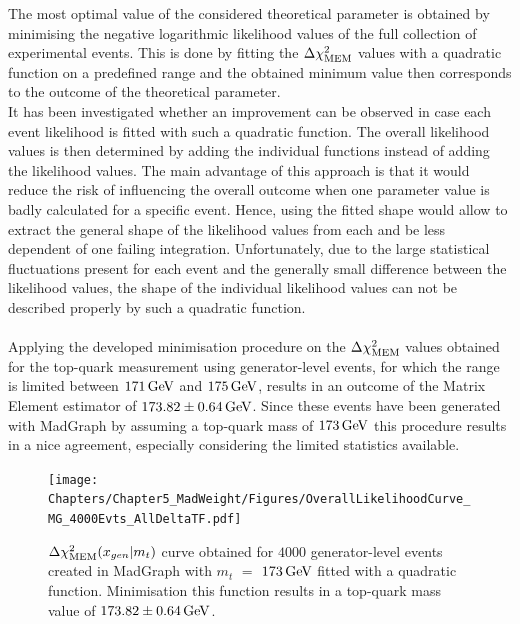 The most optimal value of the considered theoretical parameter is obtained by minimising the negative logarithmic likelihood values of the full collection of experimental events.
This is done by fitting the $\Delta \chi^{2}_{\textrm{MEM}}$ values with a quadratic function on a predefined range and the obtained minimum value then corresponds to the outcome of the theoretical parameter.
\\
It has been investigated whether an improvement can be observed in case each event likelihood is fitted with such a quadratic function. The overall likelihood values is then determined by adding the individual functions instead of adding the likelihood values. 
The main advantage of this approach is that it would reduce the risk of influencing the overall outcome when one parameter value is badly calculated for a specific event. Hence, using the fitted shape would allow to extract the general shape of the likelihood values from each and be less dependent of one failing integration.
Unfortunately, due to the large statistical fluctuations present for each event and the generally small difference between the likelihood values, the shape of the individual likelihood values can not be described properly by such a quadratic function.
\\
\\
Applying the developed minimisation procedure on the $\Delta \chi^{2}_{\textrm{MEM}}$ values obtained for the top-quark measurement using generator-level events, for which the range is limited between $171 \, \mathrm{GeV}$ and $175 \, \mathrm{GeV}$, results in an outcome of the Matrix Element estimator of $173.82 \pm 0.64 \, \mathrm{GeV}$.
Since these events have been generated with MadGraph by assuming a top-quark mass of $173 \, \mathrm{GeV}$ this procedure results in a nice agreement, especially considering the limited statistics available.
\\
\begin{figure}[h!tb]
 \centering
 \texttt{[image: Chapters/Chapter5\_MadWeight/Figures/OverallLikelihoodCurve\_MG\_4000Evts\_AllDeltaTF.pdf]}
 \caption{$\Delta \chi^{2}_{\textrm{MEM}}(x_{gen} \vert m_{t})$ curve obtained for $4000$ generator-level events created in MadGraph with $m_{t}$ $=$ $173 \, \mathrm{GeV}$ fitted with a quadratic function. Minimisation this function results in a top-quark mass value of $173.82 \pm 0.64 \, \mathrm{GeV}$.}\label{fig::FitMTGen}
\end{figure}

